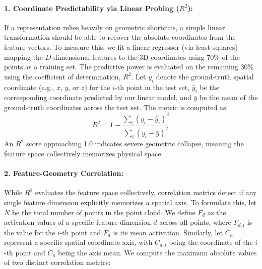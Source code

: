 \documentclass[11pt, a4paper]{article}
\begin{document}
\paragraph{1. Coordinate Predictability via Linear Probing ($R^2$):} 
If a representation relies heavily on geometric shortcuts, a simple linear transformation should be able to recover the absolute coordinates from the feature vectors. To measure this, we fit a linear regressor (via least squares) mapping the $D$-dimensional features to the 3D coordinates using 70\% of the points as a training set. The predictive power is evaluated on the remaining 30\% using the coefficient of determination, $R^2$. Let $y_i$ denote the ground-truth spatial coordinate (e.g., $x$, $y$, or $z$) for the $i$-th point in the test set, $\hat{y}_i$ be the corresponding coordinate predicted by our linear model, and $\bar{y}$ be the mean of the ground-truth coordinates across the test set. The metric is computed as:
$$ R^2 = 1 - \frac{\sum_{i} (y_i - \hat{y}_i)^2}{\sum_{i} (y_i - \bar{y})^2} $$
An $R^2$ score approaching 1.0 indicates severe geometric collapse, meaning the feature space collectively memorizes physical space.

\paragraph{2. Feature-Geometry Correlation:}
While $R^2$ evaluates the feature space collectively, correlation metrics detect if any single feature dimension explicitly memorizes a spatial axis. To formulate this, let $N$ be the total number of points in the point cloud. We define $F_d$ as the activation values of a specific feature dimension $d$ across all points, where $F_{d,i}$ is the value for the $i$-th point and $\bar{F}_d$ is its mean activation. Similarly, let $C_a$ represent a specific spatial coordinate axis, with $C_{a,i}$ being the coordinate of the $i$-th point and $\bar{C}_a$ being the axis mean. We compute the maximum absolute values of two distinct correlation metrics:
\end{document}
